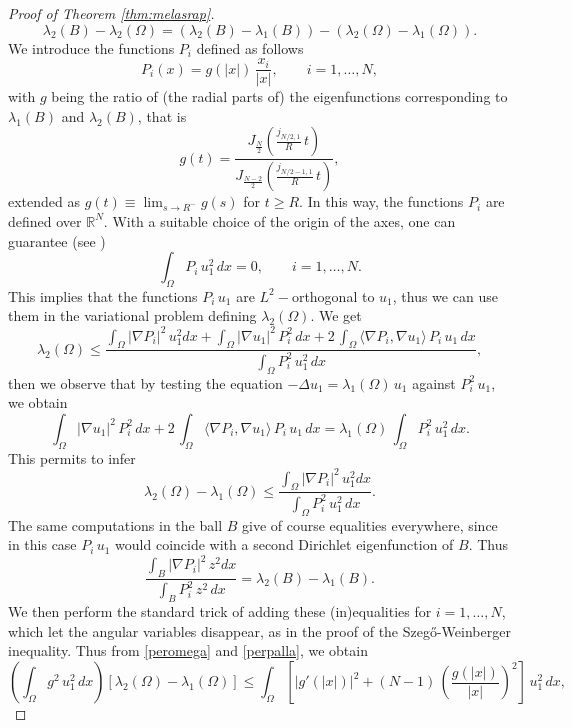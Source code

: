 \documentclass{amsart}
\theoremstyle{definition}
\numberwithin{equation}{section}
\begin{document}
\begin{proof}[Proof of Theorem \ref{thm:melasrap}]
\begin{equation}
\label{lambdi2}
\lambda_2(B)-\lambda_2(\Omega)=\left(\lambda_2(B)-\lambda_1(B)\right)-
\left(\lambda_2(\Omega)-\lambda_1(\Omega)\right).
\end{equation}
We introduce the functions $P_i$ defined as follows 
\[
P_i(x)=g(|x|)\, \frac{x_i}{|x|},\qquad i=1,\dots,N,
\]
with $g$ being the ratio of (the radial parts of) the eigenfunctions corresponding to $\lambda_1(B)$ and $\lambda_2(B)$, that is
\[
g(t)=\frac{J_\frac{N}{2}\left(\frac{j_{N/2,1}}{R}\, t\right)}{J_\frac{N-2}{2}\left(\frac{j_{N/2-1,1}}{R}\, t\right)},
\]
extended as $g(t)\equiv \lim_{s\to R^-} g(s)$ for $t\ge R$. In this way, the functions $P_i$ are defined over $\mathbb{R}^N$. With a suitable choice of the origin of the axes, one can guarantee
(see \cite[Lemma 6.2.2]{MR2251558})
\[
\int_\Omega P_i\, u_1^2\, dx=0,\qquad i=1,\dots,N.
\]
This implies that the functions $P_i\,u_1$ are $L^2-$orthogonal to $u_1$, thus we can use them in the variational problem defining $\lambda_2(\Omega)$. We get
\[
\lambda_2(\Omega)\le \frac{\displaystyle\int_\Omega |\nabla P_i|^2\,u_1^2 dx+\int_\Omega |\nabla u_1|^2\,P_i^2\,dx+2\,\int_\Omega \langle \nabla P_i,\nabla u_1\rangle\,P_i\,u_1\,dx}{\displaystyle\int_\Omega P_i^2\, u_1^2\, dx},
\]
then we observe that by testing the equation $-\Delta u_1=\lambda_1(\Omega)\,u_1$ against $P_i^2\,u_1$, we obtain
\[
\int_\Omega |\nabla u_1|^2\,P_i^2\,dx+2\,\int_\Omega \langle \nabla P_i,\nabla u_1\rangle\,P_i\,u_1\,dx=\lambda_1(\Omega)\,\int_\Omega P_i^2\,u_1^2\,dx.
\] 
This permits to infer
\begin{equation}
\label{peromega}
\lambda_2(\Omega)-\lambda_1(\Omega)\le \frac{\displaystyle\int_\Omega |\nabla P_i|^2\,u_1^2 dx}{\displaystyle\int_\Omega P_i^2\, u_1^2\, dx}.
\end{equation}
The same computations in the ball $B$ give of course equalities everywhere, since in this case $P_i\,u_1$ would coincide with a second Dirichlet eigenfunction of $B$. Thus
\begin{equation}
\label{perpalla}
\frac{\displaystyle\int_B |\nabla P_i|^2\,z^2 dx}{\displaystyle\int_B P_i^2\, z^2\, dx}=\lambda_2(B)-\lambda_1(B).
\end{equation}
We then perform the standard trick of adding these (in)equalities for $i=1,\dots,N$, which let the angular variables disappear, as in the proof of the Szeg\H{o}-Weinberger inequality.
Thus from \eqref{peromega} and \eqref{perpalla}, we obtain
\begin{equation}
\label{lambdi21}
\left(\int_\Omega g^2\, u_1^2\, dx\right)[\lambda_2(\Omega)-\lambda_1(\Omega)]\le \int_\Omega \left[|g'(|x|)|^2+(N-1)\, \left(\frac{g(|x|)}{|x|}\right)^2\right]\, u_1^2\, dx,

\end{equation}
\end{proof}
\end{document}
